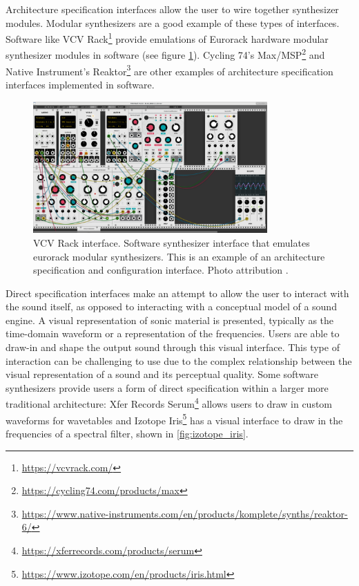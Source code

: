 Architecture specification interfaces allow the user to wire together synthesizer modules. Modular synthesizers are a good example of these types of interfaces. Software like VCV Rack\footnote{\url{https://vcvrack.com/}} provide emulations of Eurorack \cite{intellijel2019} hardware modular synthesizer modules in software (see figure \ref{fig:vcv_rack}). Cycling 74's Max/MSP\footnote{\url{https://cycling74.com/products/max}} and Native Instrument's Reaktor\footnote{\url{https://www.native-instruments.com/en/products/komplete/synths/reaktor-6/}} are other examples of architecture specification interfaces implemented in software.

\begin{figure}[ht]
    \centering
    \includegraphics[width=0.8\textwidth]{figures/background/vcv_rack.png}
    \caption{VCV Rack interface. Software synthesizer interface that emulates eurorack modular synthesizers. This is an example of an architecture specification and configuration interface. Photo attribution \cite{popolon2018vcv}.}
    \label{fig:vcv_rack}
\end{figure}

Direct specification interfaces make an attempt to allow the user to interact with the sound itself, as opposed to interacting with a conceptual model of a sound engine. A visual representation of sonic material is presented, typically as the time-domain waveform or a representation of the frequencies. Users are able to draw-in and shape the output sound through this visual interface. This type of interaction can be challenging to use due to the complex relationship between the visual representation of a sound and its perceptual quality. Some software synthesizers provide users a form of direct specification within a larger more traditional architecture: Xfer Records Serum\footnote{\url{https://xferrecords.com/products/serum}} allows users to draw in custom waveforms for wavetables and Izotope Iris\footnote{\url{https://www.izotope.com/en/products/iris.html}} has a visual interface to draw in the frequencies of a spectral filter, shown in \ref{fig:izotope_iris}. 

